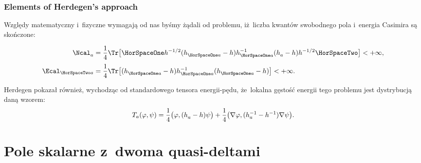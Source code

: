 \documentclass[10pt,t]{beamer}
\begin{document}
\begin{frame}
  \frametitle{Elements of Herdegen's approach}


  Względy matematyczny i~fizyczne wymagają od nas byśmy żądali
  od problemu, iż~liczba kwantów swobodnego pola i~energia Casimira
  są skończone:

  \vspace{-2.2em}



  \begin{subequations}

    \begin{align}
      \label{eq:Algebraiczne-podejscie-ETC-05-A}
      \Ncal_{ a }^{ \vphantom{1} }
      &=
        \frac{ 1 }{ 4 } \Tr\big[ \HorSpaceOne h^{ -1/2 } (
        h_{ \HorSpaceOne a }^{ \vphantom{1} } - h )
        h_{ \HorSpaceOne a }^{ -1 }
        ( h_{ a }^{ \vphantom{1} } - h ) h^{ -1/2 } \HorSpaceTwo \big]
        < +\infty, \\[0.3em]
      \label{eq:Algebraiczne-podejscie-ETC-05-B}
      \Ecal_{ \HorSpaceTwo a }
      &=
        \frac{ 1 }{ 4 }
        \Tr\big[ ( h_{ \HorSpaceOne a }^{ \vphantom{1} } - h )
        h_{ \HorSpaceOne a }^{ -1 }
        ( h_{ \HorSpaceOne a }^{ \vphantom{1} } - h ) \big] < +\infty.
    \end{align}

  \end{subequations}

  \vspace{-1em}



  Herdegen pokazał również, wychodząc od standardowego tensora energii-pędu,
  że~lokalna gęstość energii tego problemu jest dystrybucją daną wzorem:
  \begin{equation}
    \label{eq:Algebraiczne-podejscie-ETC-06}
    T_{ a }( \varphi, \psi ) =
    \frac{ 1 }{ 4 } \big( \varphi, ( h_{ a }^{ \vphantom{1} } - h ) \psi \big) +
    \frac{ 1 }{ 4 } \big( \nabla \varphi, ( h_{ a }^{ -1 } -
    h^{ -1 }_{ \vphantom{a} } ) \nabla \psi \big).
  \end{equation}

\end{frame}










\section{Pole skalarne z~dwoma quasi-deltami}
\end{document}
